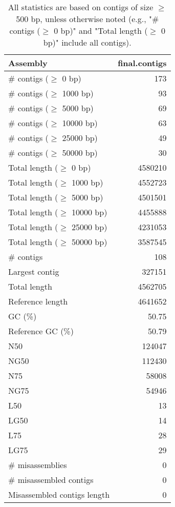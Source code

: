 \documentclass[12pt,a4paper]{article}
\begin{document}
\begin{table}[ht]
\begin{center}
\caption{All statistics are based on contigs of size $\geq$ 500 bp, unless otherwise noted (e.g., "\# contigs ($\geq$ 0 bp)" and "Total length ($\geq$ 0 bp)" include all contigs).}
\begin{tabular}{|l*{1}{|r}|}
\hline
Assembly & final.contigs \\ \hline
\# contigs ($\geq$ 0 bp) & 173 \\ \hline
\# contigs ($\geq$ 1000 bp) & 93 \\ \hline
\# contigs ($\geq$ 5000 bp) & 69 \\ \hline
\# contigs ($\geq$ 10000 bp) & 63 \\ \hline
\# contigs ($\geq$ 25000 bp) & 49 \\ \hline
\# contigs ($\geq$ 50000 bp) & 30 \\ \hline
Total length ($\geq$ 0 bp) & 4580210 \\ \hline
Total length ($\geq$ 1000 bp) & 4552723 \\ \hline
Total length ($\geq$ 5000 bp) & 4501501 \\ \hline
Total length ($\geq$ 10000 bp) & 4455888 \\ \hline
Total length ($\geq$ 25000 bp) & 4231053 \\ \hline
Total length ($\geq$ 50000 bp) & 3587545 \\ \hline
\# contigs & 108 \\ \hline
Largest contig & 327151 \\ \hline
Total length & 4562705 \\ \hline
Reference length & 4641652 \\ \hline
GC (\%) & 50.75 \\ \hline
Reference GC (\%) & 50.79 \\ \hline
N50 & 124047 \\ \hline
NG50 & 112430 \\ \hline
N75 & 58008 \\ \hline
NG75 & 54946 \\ \hline
L50 & 13 \\ \hline
LG50 & 14 \\ \hline
L75 & 28 \\ \hline
LG75 & 29 \\ \hline
\# misassemblies & 0 \\ \hline
\# misassembled contigs & 0 \\ \hline
Misassembled contigs length & 0 \\ \hline

\end{tabular}
\end{center}
\end{table}
\end{document}
